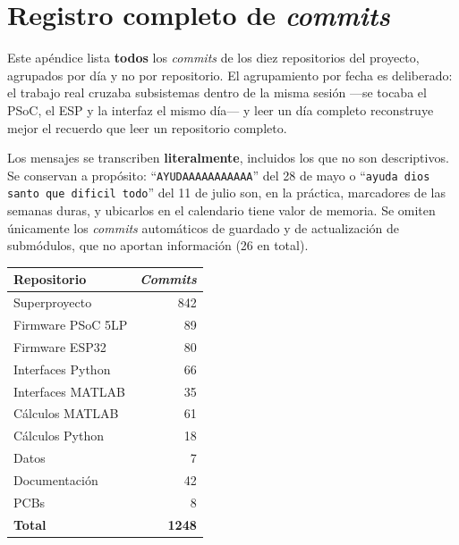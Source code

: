 \section{Registro completo de \emph{commits}}
\label{sec:commits}

Este ap\'endice lista \textbf{todos} los \emph{commits} de los diez
repositorios del proyecto, agrupados por d\'ia y no por repositorio. El
agrupamiento por fecha es deliberado: el trabajo real cruzaba subsistemas dentro
de la misma sesi\'on ---se tocaba el PSoC, el ESP y la interfaz el mismo d\'ia---
y leer un d\'ia completo reconstruye mejor el recuerdo que leer un repositorio
completo.

Los mensajes se transcriben \textbf{literalmente}, incluidos los que
no son descriptivos. Se conservan a prop\'osito: ``\texttt{AYUDAAAAAAAAAAA}'' del
28 de mayo o ``\texttt{ayuda dios santo que dificil todo}'' del 11 de julio son,
en la pr\'actica, marcadores de las semanas duras, y ubicarlos en el calendario
tiene valor de memoria. Se omiten \'unicamente los \emph{commits} autom\'aticos de
guardado y de actualizaci\'on de subm\'odulos, que no aportan informaci\'on
(26 en total).

\begin{center}\footnotesize
\begin{tabular}{@{}lr@{}}
\toprule
Repositorio & \emph{Commits} \\
\midrule
Superproyecto & 842 \\
Firmware PSoC 5LP & 89 \\
Firmware ESP32 & 80 \\
Interfaces Python & 66 \\
Interfaces MATLAB & 35 \\
C\'alculos MATLAB & 61 \\
C\'alculos Python & 18 \\
Datos & 7 \\
Documentaci\'on & 42 \\
PCBs & 8 \\
\midrule
\textbf{Total} & \textbf{1248} \\
\bottomrule
\end{tabular}
\end{center}

